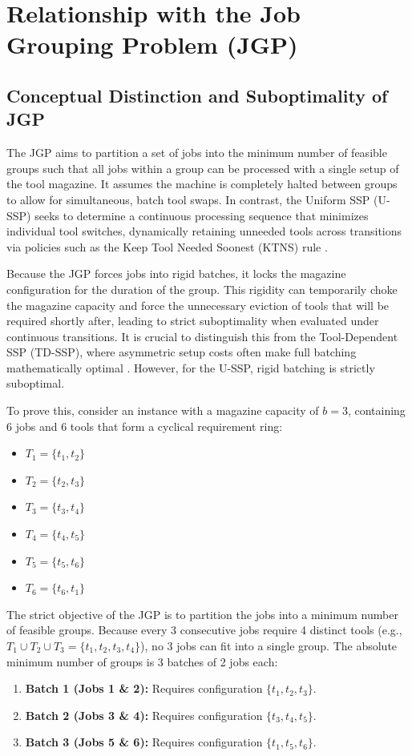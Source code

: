 \documentclass[12pt]{article}
\begin{document}
\section{Relationship with the Job Grouping Problem (JGP)}
\label{sec:jgp_bounds}

\subsection{Conceptual Distinction and Suboptimality of JGP}

The JGP aims to partition a set of jobs into the minimum number of feasible groups such that all jobs within a group can be processed with a single setup of the tool magazine. It assumes the machine is completely halted between groups to allow for simultaneous, batch tool swaps. In contrast, the Uniform SSP (U-SSP) seeks to determine a continuous processing sequence that minimizes individual tool switches, dynamically retaining unneeded tools across transitions via policies such as the Keep Tool Needed Soonest (KTNS) rule \cite{Tang1988}.

Because the JGP forces jobs into rigid batches, it locks the magazine configuration for the duration of the group. This rigidity can temporarily choke the magazine capacity and force the unnecessary eviction of tools that will be required shortly after, leading to strict suboptimality when evaluated under continuous transitions. It is crucial to distinguish this from the Tool-Dependent SSP (TD-SSP), where asymmetric setup costs often make full batching mathematically optimal \cite{Crama1994}. However, for the U-SSP, rigid batching is strictly suboptimal.

To prove this, consider an instance with a magazine capacity of $b = 3$, containing 6 jobs and 6 tools that form a cyclical requirement ring:
\begin{itemize}[noitemsep]
	\item $T_1 = \{t_1, t_2\}$
	\item $T_2 = \{t_2, t_3\}$
	\item $T_3 = \{t_3, t_4\}$
	\item $T_4 = \{t_4, t_5\}$
	\item $T_5 = \{t_5, t_6\}$
	\item $T_6 = \{t_6, t_1\}$
\end{itemize}

The strict objective of the JGP is to partition the jobs into a minimum number of feasible groups. Because every 3 consecutive jobs require 4 distinct tools (e.g., $T_1 \cup T_2 \cup T_3 = \{t_1, t_2, t_3, t_4\}$), no 3 jobs can fit into a single group. The absolute minimum number of groups is 3 batches of 2 jobs each:
\begin{enumerate}[noitemsep]
	\item \textbf{Batch 1 (Jobs 1 \& 2):} Requires configuration $\{t_1, t_2, t_3\}$.
	\item \textbf{Batch 2 (Jobs 3 \& 4):} Requires configuration $\{t_3, t_4, t_5\}$.
	\item \textbf{Batch 3 (Jobs 5 \& 6):} Requires configuration $\{t_1, t_5, t_6\}$.
\end{enumerate}
\end{document}
